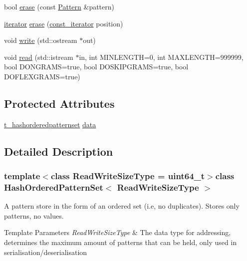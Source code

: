 \begin{DoxyCompactItemize}
\item 
bool \hyperlink{classHashOrderedPatternSet_ab48e2380fcc00d9dc0ef01d9217fb5e6}{erase} (const \hyperlink{classPattern}{Pattern} \&pattern)
\item 
\hyperlink{classHashOrderedPatternSet_a3191eb8aa122dfe2bf819d37468bd0b6}{iterator} \hyperlink{classHashOrderedPatternSet_a6240dd699062a02b09811935517edab2}{erase} (\hyperlink{classHashOrderedPatternSet_a5e1bbb1c4ef5ee0937bc0d5251a8d97e}{const\+\_\+iterator} position)
\item 
void \hyperlink{classHashOrderedPatternSet_a5410dc1022729fe531e7ef7dcd0e845c}{write} (std\+::ostream $\ast$out)
\item 
void \hyperlink{classHashOrderedPatternSet_ae4f18bc4f126da615a0ec194fe8f24b0}{read} (std\+::istream $\ast$in, int M\+I\+N\+L\+E\+N\+G\+T\+H=0, int M\+A\+X\+L\+E\+N\+G\+T\+H=999999, bool D\+O\+N\+G\+R\+A\+M\+S=true, bool D\+O\+S\+K\+I\+P\+G\+R\+A\+M\+S=true, bool D\+O\+F\+L\+E\+X\+G\+R\+A\+M\+S=true)
\end{DoxyCompactItemize}
\subsection*{Protected Attributes}
\begin{DoxyCompactItemize}
\item 
\hyperlink{patternstore_8h_a95f03de9f728d05eb31111e2dbdac6a7}{t\+\_\+hashorderedpatternset} \hyperlink{classHashOrderedPatternSet_a04f495b51e93c8f7d6798623398e5e61}{data}
\end{DoxyCompactItemize}


\subsection{Detailed Description}
\subsubsection*{template$<$class Read\+Write\+Size\+Type = uint64\+\_\+t$>$class Hash\+Ordered\+Pattern\+Set$<$ Read\+Write\+Size\+Type $>$}

A pattern store in the form of an ordered set (i.\+e, no duplicates). Stores only patterns, no values. 


\begin{DoxyTemplParams}{Template Parameters}
{\em Read\+Write\+Size\+Type} & The data type for addressing, determines the maximum amount of patterns that can be held, only used in serialisation/deserialisation \\
\hline
\end{DoxyTemplParams}


